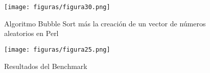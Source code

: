 \begin{figure}[H] %
	\centering
	\texttt{[image: figuras/figura30.png]}  %
	
	
	\caption{Algoritmo Bubble Sort más la creación de un vector de números aleatorios en Perl}
	\label{figura30}
\end{figure}

\begin{figure}[H] %
	\centering
	\texttt{[image: figuras/figura25.png]}  %
	
	
	\caption{Resultados del Benchmark}
	\label{figura25}
\end{figure}
\newpage

